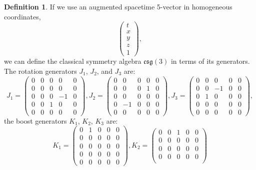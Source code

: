 \documentclass{amsart}
\theoremstyle{definition}
\newtheorem{definition}{Definition}[theorem]
\theoremstyle{remark}
\begin{document}
\begin{definition}
  If we use an augmented spacetime 5-vector in homogeneous coordinates,
  \[
  \begin{pmatrix}
    t \\
    x \\
    y \\
    z \\
    1
  \end{pmatrix},
  \]
  we can define the classical symmetry algebra $\mathfrak{csg}(3)$ in terms of its generators. The rotation generators $J_1$, $J_2$, and $J_3$ are:
  \[
  J_1 =
  \begin{pmatrix}
    0 & 0 & 0 & 0 & 0 \\
    0 & 0 & 0 & 0 & 0 \\
    0 & 0 & 0 & -1 & 0 \\
    0 & 0 & 1 & 0 & 0 \\
    0 & 0 & 0 & 0 & 0
  \end{pmatrix},
  J_2 =
  \begin{pmatrix}
    0 & 0 & 0 & 0 & 0 \\
    0 & 0 & 0 & 1 & 0 \\
    0 & 0 & 0 & 0 & 0 \\
    0 & -1 & 0 & 0 & 0 \\
    0 & 0 & 0 & 0 & 0
  \end{pmatrix},
  J_3 =
  \begin{pmatrix}
    0 & 0 & 0 & 0 & 0 \\
    0 & 0 & -1 & 0 & 0 \\
    0 & 1 & 0 & 0 & 0 \\
    0 & 0 & 0 & 0 & 0 \\
    0 & 0 & 0 & 0 & 0
  \end{pmatrix},
  \]
  the boost generators $K_1$, $K_2$, $K_3$ are:
  \[
  K_1 =
  \begin{pmatrix}
    0 & 1 & 0 & 0 & 0 \\
    0 & 0 & 0 & 0 & 0 \\
    0 & 0 & 0 & 0 & 0 \\
    0 & 0 & 0 & 0 & 0 \\
    0 & 0 & 0 & 0 & 0
  \end{pmatrix},
  K_2 =
  \begin{pmatrix}
    0 & 0 & 1 & 0 & 0 \\
    0 & 0 & 0 & 0 & 0 \\
    0 & 0 & 0 & 0 & 0 \\
    0 & 0 & 0 & 0 & 0 \\

\end{pmatrix}\]
\end{definition}
\end{document}
